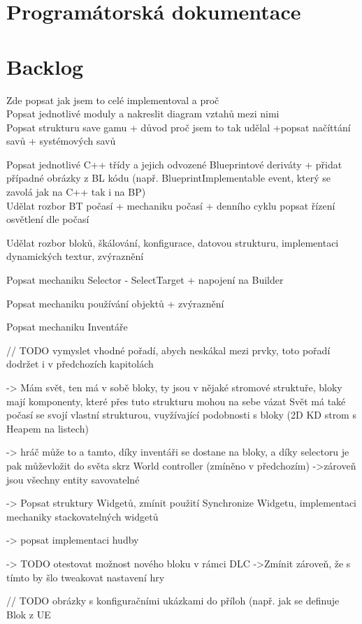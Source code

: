 
\chapter{Programátorská dokumentace}




\chapter{Backlog}

Zde popsat jak jsem to celé implementoval a proč\\

Popsat jednotlivé moduly a nakreslit diagram vztahů mezi nimi\\

Popsat strukturu save gamu + důvod proč jsem to tak udělal
+popsat načíttání savů + systémových savů


Popsat jednotlivé C++ třídy a jejich odvozené Blueprintové deriváty + přidat případné obrázky z BL kódu (např. BlueprintImplementable event, který se zavolá jak na C++ tak i na BP) \\

Udělat rozbor BT počasí + mechaniku počasí + denního cyklu
popsat řízení osvětlení dle počasí

Udělat rozbor bloků, škálování, konfigurace, datovou strukturu, implementaci dynamických textur, zvýraznění

Popsat mechaniku Selector - SelectTarget + napojení na Builder

Popsat mechaniku používání objektů + zvýraznění

Popsat mechaniku Inventáře

// TODO vymyslet vhodné pořadí, abych neskákal mezi prvky, toto pořadí dodržet i v předchozích kapitolách

-> Mám svět, ten má v sobě bloky, ty jsou v nějaké stromové struktuře, bloky mají komponenty, které přes tuto strukturu mohou na sebe vázat
Svět má také počasí se svojí vlastní strukturou, vuyžívající podobnosti s bloky (2D KD strom s Heapem na listech)

-> hráč může to a tamto, díky inventáři se dostane na bloky, a díky selectoru je pak můževložit do světa skrz World controller (zmíněno v předchozím)
->zároveň jsou všechny entity savovatelné 


-> Popsat struktury Widgetů, zmínit použití Synchronize Widgetu, implementaci mechaniky stackovatelných widgetů

-> popsat implementaci hudby

-> TODO otestovat možnost nového bloku v rámci DLC
->Zmínit zároveň, že s tímto by šlo tweakovat nastavení hry



// TODO obrázky s konfiguračními ukázkami do příloh (např. jak se definuje Blok z UE


